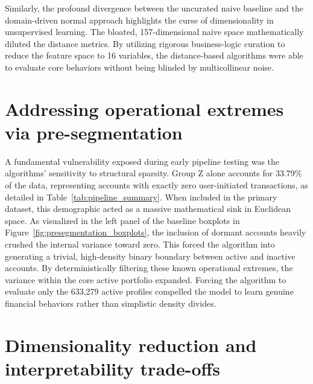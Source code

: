 Similarly, the profound divergence between the uncurated naive baseline and the domain-driven normal approach highlights the curse of dimensionality in unsupervised learning. The bloated, 157-dimensional naive space mathematically diluted the distance metrics. By utilizing rigorous business-logic curation to reduce the feature space to 16 variables, the distance-based algorithms were able to evaluate core behaviors without being blinded by multicollinear noise. 

\section{Addressing operational extremes via pre-segmentation}

A fundamental vulnerability exposed during early pipeline testing was the algorithms' sensitivity to structural sparsity.
Group Z alone accounts for 33.79\% of the data, representing accounts with exactly zero user-initiated transactions, as detailed in Table~\ref{tab:pipeline_summary}.
When included in the primary dataset, this demographic acted as a massive mathematical sink in Euclidean space.
As visualized in the left panel of the baseline boxplots in Figure~\ref{fig:presegmentation_boxplots}, the inclusion of dormant accounts heavily crushed the internal variance toward zero.
This forced the algorithm into generating a trivial, high-density binary boundary between active and inactive accounts.
By deterministically filtering these known operational extremes, the variance within the core active portfolio expanded.
Forcing the algorithm to evaluate only the 633,279 active profiles compelled the model to learn genuine financial behaviors rather than simplistic density divides.

\section{Dimensionality reduction and interpretability trade-offs}

